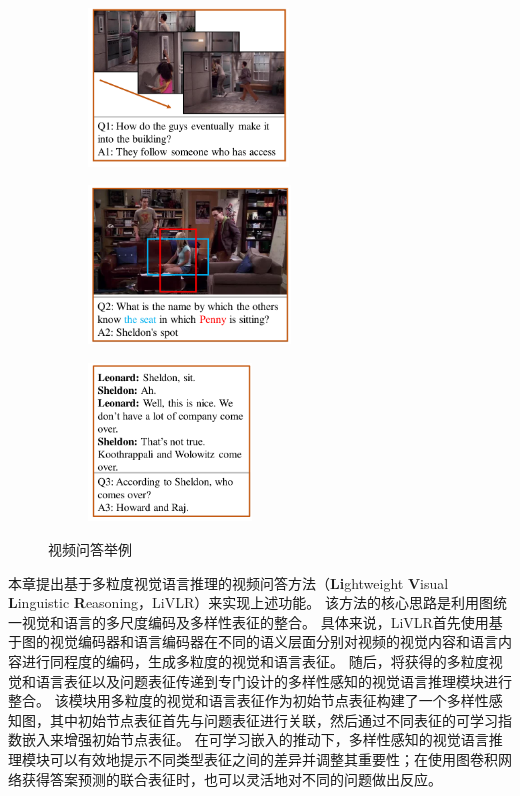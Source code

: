 \begin{figure}[!t]
\begin{subfigure}[b]{0.35\linewidth}
\centering
\includegraphics[height=4.2cm]{figure/c2_q1.pdf}
\label{fig:c2_diversity_q1} 
\end{subfigure}
\begin{subfigure}[b]{0.35\linewidth}
\centering
\includegraphics[height=4.2cm]{figure/c2_q2.pdf}
\label{fig:c2_diversity_q2} 
\end{subfigure}
\begin{subfigure}[b]{0.285\linewidth}
\centering
\includegraphics[height=4.2cm]{figure/c2_q3.pdf}
\label{fig:c2_diversity_q3} 
\end{subfigure}
\caption{视频问答举例}
\label{fig:c2_diversity} 
\end{figure}

本章提出基于多粒度视觉语言推理的视频问答方法（\textbf{Li}ghtweight \textbf{V}isual \textbf{L}inguistic \textbf{R}easoning，LiVLR）来实现上述功能。
该方法的核心思路是利用图统一视觉和语言的多尺度编码及多样性表征的整合。
具体来说，LiVLR首先使用基于图的视觉编码器和语言编码器在不同的语义层面分别对视频的视觉内容和语言内容进行同程度的编码，生成多粒度的视觉和语言表征。
随后，将获得的多粒度视觉和语言表征以及问题表征传递到专门设计的多样性感知的视觉语言推理模块进行整合。
该模块用多粒度的视觉和语言表征作为初始节点表征构建了一个多样性感知图，其中初始节点表征首先与问题表征进行关联，然后通过不同表征的可学习指数嵌入来增强初始节点表征。
在可学习嵌入的推动下，多样性感知的视觉语言推理模块可以有效地提示不同类型表征之间的差异并调整其重要性；在使用图卷积网络获得答案预测的联合表征时，也可以灵活地对不同的问题做出反应。

